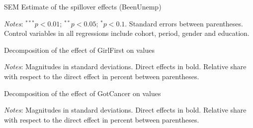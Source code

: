 \begin{table}[!htb]
    \centering
    \caption{SEM Estimate of the spillover effects (BeenUnemp)}
    \label{chap3-tab:reg-v5-sem-BU-stage12}
    \begin{threeparttable}
        
        \begin{tablenotes}[flushleft]
            \footnotesize{\item \textit{Notes}: $^{***}p<0.01$; $^{**}p<0.05$; $^{*}p<0.1$. Standard errors between parentheses. Control variables in all regressions include cohort, period, gender and education.}
        \end{tablenotes}
    \end{threeparttable}%
\end{table}

\begin{table}[!htb]
    \centering
    \caption{Decomposition of the effect of GirlFirst on values}
    \label{chap3-tab:decomp-GF}
    \begin{threeparttable}
        \setlength{\tabcolsep}{12pt}
        
        \begin{tablenotes}[flushleft]
            \footnotesize{\item \textit{Notes}: Magnitudes in standard deviations. Direct effects in bold. Relative share with respect to the direct effect in percent between parentheses.}
        \end{tablenotes}
    \end{threeparttable}
\end{table}

\begin{table}[!htb]
    \centering
    \caption{Decomposition of the effect of GotCancer on values}
    \label{chap3-tab:decomp-GC}
    \begin{threeparttable}
        \setlength{\tabcolsep}{12pt}
        
        \begin{tablenotes}[flushleft]
            \footnotesize{\item \textit{Notes}: Magnitudes in standard deviations. Direct effects in bold. Relative share with respect to the direct effect in percent between parentheses.}
        \end{tablenotes}
    \end{threeparttable}
\end{table}

